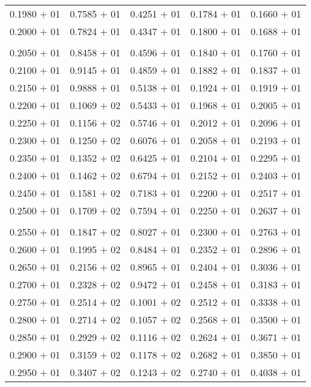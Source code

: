 \documentclass[a4paper,11pt]{article}
\begin{document}
\begin{center}
\begin{longtable}{ c c c c c }
0.1980 $+$ 01 & 0.7585 $+$ 01 & 0.4251 $+$ 01 & 0.1784 $+$ 01 & 0.1660 $+$ 01 \\
0.2000 $+$ 01 & 0.7824 $+$ 01 & 0.4347 $+$ 01 & 0.1800 $+$ 01 & 0.1688 $+$ 01 \\
\\
0.2050 $+$ 01 & 0.8458 $+$ 01 & 0.4596 $+$ 01 & 0.1840 $+$ 01 & 0.1760 $+$ 01 \\
0.2100 $+$ 01 & 0.9145 $+$ 01 & 0.4859 $+$ 01 & 0.1882 $+$ 01 & 0.1837 $+$ 01 \\
0.2150 $+$ 01 & 0.9888 $+$ 01 & 0.5138 $+$ 01 & 0.1924 $+$ 01 & 0.1919 $+$ 01 \\
0.2200 $+$ 01 & 0.1069 $+$ 02 & 0.5433 $+$ 01 & 0.1968 $+$ 01 & 0.2005 $+$ 01 \\
0.2250 $+$ 01 & 0.1156 $+$ 02 & 0.5746 $+$ 01 & 0.2012 $+$ 01 & 0.2096 $+$ 01 \\
0.2300 $+$ 01 & 0.1250 $+$ 02 & 0.6076 $+$ 01 & 0.2058 $+$ 01 & 0.2193 $+$ 01 \\
0.2350 $+$ 01 & 0.1352 $+$ 02 & 0.6425 $+$ 01 & 0.2104 $+$ 01 & 0.2295 $+$ 01 \\
0.2400 $+$ 01 & 0.1462 $+$ 02 & 0.6794 $+$ 01 & 0.2152 $+$ 01 & 0.2403 $+$ 01 \\
0.2450 $+$ 01 & 0.1581 $+$ 02 & 0.7183 $+$ 01 & 0.2200 $+$ 01 & 0.2517 $+$ 01 \\
0.2500 $+$ 01 & 0.1709 $+$ 02 & 0.7594 $+$ 01 & 0.2250 $+$ 01 & 0.2637 $+$ 01 \\
\\
0.2550 $+$ 01 & 0.1847 $+$ 02 & 0.8027 $+$ 01 & 0.2300 $+$ 01 & 0.2763 $+$ 01 \\
0.2600 $+$ 01 & 0.1995 $+$ 02 & 0.8484 $+$ 01 & 0.2352 $+$ 01 & 0.2896 $+$ 01 \\
0.2650 $+$ 01 & 0.2156 $+$ 02 & 0.8965 $+$ 01 & 0.2404 $+$ 01 & 0.3036 $+$ 01 \\
0.2700 $+$ 01 & 0.2328 $+$ 02 & 0.9472 $+$ 01 & 0.2458 $+$ 01 & 0.3183 $+$ 01 \\
0.2750 $+$ 01 & 0.2514 $+$ 02 & 0.1001 $+$ 02 & 0.2512 $+$ 01 & 0.3338 $+$ 01 \\
0.2800 $+$ 01 & 0.2714 $+$ 02 & 0.1057 $+$ 02 & 0.2568 $+$ 01 & 0.3500 $+$ 01 \\
0.2850 $+$ 01 & 0.2929 $+$ 02 & 0.1116 $+$ 02 & 0.2624 $+$ 01 & 0.3671 $+$ 01 \\
0.2900 $+$ 01 & 0.3159 $+$ 02 & 0.1178 $+$ 02 & 0.2682 $+$ 01 & 0.3850 $+$ 01 \\
0.2950 $+$ 01 & 0.3407 $+$ 02 & 0.1243 $+$ 02 & 0.2740 $+$ 01 & 0.4038 $+$ 01 \\

\end{longtable}
\end{center}
\end{document}
